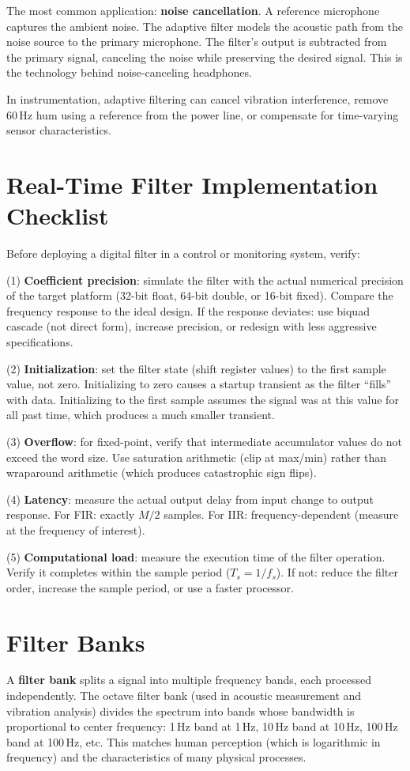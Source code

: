 \documentclass[11pt,letterpaper,twoside,openany]{book}
\begin{document}
The most common application: \textbf{noise cancellation}. A reference microphone captures the ambient noise. The adaptive filter models the acoustic path from the noise source to the primary microphone. The filter's output is subtracted from the primary signal, canceling the noise while preserving the desired signal. This is the technology behind noise-canceling headphones.

In instrumentation, adaptive filtering can cancel vibration interference, remove 60\,Hz hum using a reference from the power line, or compensate for time-varying sensor characteristics.
\section{Real-Time Filter Implementation Checklist}
Before deploying a digital filter in a control or monitoring system, verify:

(1) \textbf{Coefficient precision}: simulate the filter with the actual numerical precision of the target platform (32-bit float, 64-bit double, or 16-bit fixed). Compare the frequency response to the ideal design. If the response deviates: use biquad cascade (not direct form), increase precision, or redesign with less aggressive specifications.

(2) \textbf{Initialization}: set the filter state (shift register values) to the first sample value, not zero. Initializing to zero causes a startup transient as the filter ``fills'' with data. Initializing to the first sample assumes the signal was at this value for all past time, which produces a much smaller transient.

(3) \textbf{Overflow}: for fixed-point, verify that intermediate accumulator values do not exceed the word size. Use saturation arithmetic (clip at max/min) rather than wraparound arithmetic (which produces catastrophic sign flips).

(4) \textbf{Latency}: measure the actual output delay from input change to output response. For FIR: exactly $M/2$ samples. For IIR: frequency-dependent (measure at the frequency of interest).

(5) \textbf{Computational load}: measure the execution time of the filter operation. Verify it completes within the sample period ($T_s = 1/f_s$). If not: reduce the filter order, increase the sample period, or use a faster processor.

\section{Filter Banks}
A \textbf{filter bank} splits a signal into multiple frequency bands, each processed independently. The octave filter bank (used in acoustic measurement and vibration analysis) divides the spectrum into bands whose bandwidth is proportional to center frequency: 1\,Hz band at 1\,Hz, 10\,Hz band at 10\,Hz, 100\,Hz band at 100\,Hz, etc. This matches human perception (which is logarithmic in frequency) and the characteristics of many physical processes.
\end{document}
